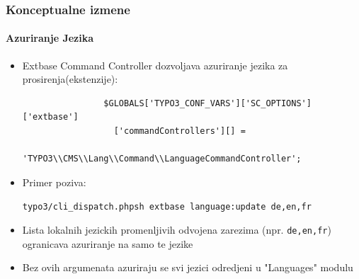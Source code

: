 
\begin{frame}[fragile]
	\frametitle{Konceptualne izmene}
	\framesubtitle{Azuriranje Jezika}

	\begin{itemize}
		\item Extbase Command Controller dozvoljava azuriranje jezika za prosirenja(ekstenzije):

			\begin{lstlisting}
				$GLOBALS['TYPO3_CONF_VARS']['SC_OPTIONS']['extbase']
				  ['commandControllers'][] =
				  'TYPO3\\CMS\\Lang\\Command\\LanguageCommandController';
			\end{lstlisting}

		\item Primer poziva:

			\lstinline!typo3/cli_dispatch.phpsh extbase language:update de,en,fr!

		\item Lista lokalnih jezickih promenljivih odvojena zarezima (npr. \texttt{de,en,fr}) ogranicava azuriranje na samo te jezike
		\item Bez ovih argumenata azuriraju se svi jezici odredjeni u "Languages" modulu

	\end{itemize}

\end{frame}



